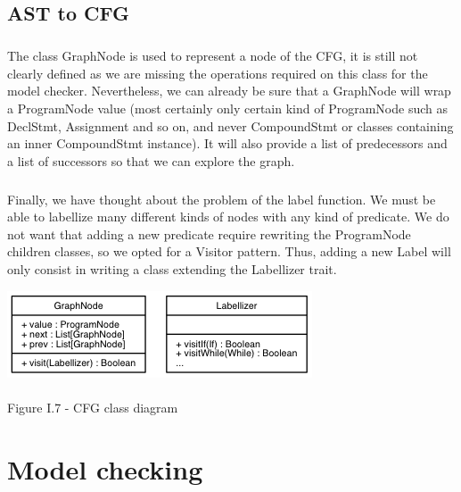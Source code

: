\documentclass{report}
\begin{document}
\section{AST to CFG}

\paragraph{}
\hspace{4mm}\textnormal{The class GraphNode is used to represent a node of the CFG, it is still not clearly defined as we are missing the operations
required on this class for the model checker. Nevertheless, we can already be sure that a GraphNode will wrap a ProgramNode value (most certainly only certain kind
of ProgramNode such as DeclStmt, Assignment and so on, and never CompoundStmt or classes containing an inner CompoundStmt instance). It will also provide a list
of predecessors and a list of successors so that we can explore the graph.}

\paragraph{}
\hspace{4mm}\textnormal{Finally, we have thought about the problem of the label function. We must be able to labellize many different kinds of nodes
with any kind of predicate. We do not want that adding a new predicate require rewriting the ProgramNode children classes, so we opted for
a Visitor pattern. Thus, adding a new Label will only consist in writing a class extending the Labellizer trait.}

\begin{center}
\includegraphics[scale=0.8]{data/CFG.png}
~\\~\\Figure I.7 - CFG class diagram
\end{center}

\chapter{Model checking}
\end{document}
